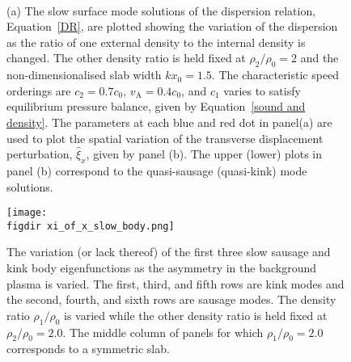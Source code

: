 \documentclass[12pt]{../style-files/ociamthesis}
\begin{document}
\begin{figure} []
	\centering
	 \\
	\caption{(a) The slow surface mode solutions of the dispersion relation, Equation~\eqref{DR}, are plotted showing the variation of the dispersion as the ratio of one external density to the internal density is changed. The other density ratio is held fixed at $\rho_2/\rho_0=2$ and the non-dimensionalised slab width $kx_0 = 1.5$. The characteristic speed orderings are $c_2=0.7c_0$, $v_\textrm{A}=0.4c_0$, and $c_1$ varies to satisfy equilibrium pressure balance, given by Equation~\eqref{sound and density}. The parameters at each blue and red dot in panel(a) are used to plot the spatial variation of the transverse displacement perturbation, $\widehat{\xi}_x$, given by panel (b). The upper (lower) plots in panel (b) correspond to the quasi-sausage (quasi-kink) mode solutions.}
	\label{fig: avoided crossing}
\end{figure}

\begin{figure}
	\centering
	\texttt{[image: \\figdir xi\_of\_x\_slow\_body.png]}
	\caption{The variation (or lack thereof) of the first three slow sausage and kink body eigenfunctions as the asymmetry in the background plasma is varied. The first, third, and fifth rows are kink modes and the second, fourth, and sixth rows are sausage modes. The density ratio $\rho_1/\rho_0$ is varied while the other density ratio is held fixed at $\rho_2/\rho_0 = 2.0$. The middle column of panels for which $\rho_1/\rho_0 = 2.0$ corresponds to a symmetric slab.}
	\label{fig: body eigenmodes}
\end{figure}
\end{document}
